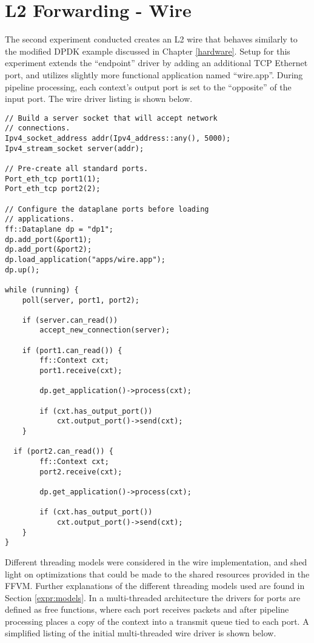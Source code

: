 \section{L2 Forwarding - Wire}
\label{expr:wire}
The second experiment conducted creates an L2 wire that behaves similarly
to the modified DPDK example discussed in Chapter \ref{hardware}. Setup for
this experiment extends the ``endpoint'' driver by adding an additional TCP
Ethernet port, and utilizes slightly more functional application named
``wire.app''. During pipeline processing, each context's output port is set
to the ``opposite'' of the input port. The wire driver listing is shown below.

\begin{lstlisting}
// Build a server socket that will accept network
// connections.
Ipv4_socket_address addr(Ipv4_address::any(), 5000);
Ipv4_stream_socket server(addr);

// Pre-create all standard ports.
Port_eth_tcp port1(1);
Port_eth_tcp port2(2);

// Configure the dataplane ports before loading
// applications.
ff::Dataplane dp = "dp1";
dp.add_port(&port1);
dp.add_port(&port2);
dp.load_application("apps/wire.app");
dp.up();

while (running) {
	poll(server, port1, port2);

	if (server.can_read())
		accept_new_connection(server);

	if (port1.can_read()) {
		ff::Context cxt;
		port1.receive(cxt);

		dp.get_application()->process(cxt);

		if (cxt.has_output_port())
			cxt.output_port()->send(cxt);
	}

  if (port2.can_read()) {
		ff::Context cxt;
		port2.receive(cxt);

		dp.get_application()->process(cxt);

		if (cxt.has_output_port())
			cxt.output_port()->send(cxt);
	}
}
\end{lstlisting}

Different threading models were considered in the wire implementation, and shed
light on optimizations that could be made to the shared resources provided in
the FFVM. Further explanations of the different threading models used are found
in Section \ref{expr:models}. In a multi-threaded architecture the drivers for
ports are defined as free functions, where each port receives packets
and after pipeline processing places a copy of the context into a transmit queue
tied to each port. A simplified listing of the initial multi-threaded wire
driver is shown below.

